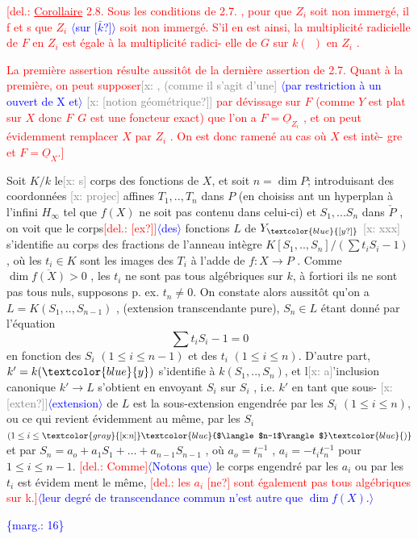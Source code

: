 \documentclass[11pt]{article}
\newcommand{\hand}[1]{\textcolor{blue}{#1}}
\newcommand{\inserted}[2][]{\textcolor{blue}{$\langle$#2$\rangle$}}
\newcommand{\margin}[1]{\textcolor{blue}{\{\textsf{marg.:} #1\}}}
\newcommand{\deleted}[1]{\textcolor{red}{[\textsf{del.:} #1]}}
\newcommand{\xout}[1]{\textcolor{gray}{[\textsf{x:} #1]}}
\newcommand{\uline}[1]{\underline{#1}}
\newcommand{\unsure}[1]{[#1?]}
\begin{document}
\deleted{\uline{Corollaire} 2.8. Sous les conditions de 2.7. , pour que $Z_i$ soit non
immergé, il f et s que $Z_i$ \inserted[typed]{sur \unsure{$\bar{k}$}} soit non immergé. S'il en est ainsi, la
multiplicité radicielle de $F$ en $Z_i$ est égale à la multiplicité radici-%
elle de $G$ sur $k(\ \ )$ en $Z_i$ .

La première assertion résulte aussitôt de la dernière assertion
de 2.7. Quant à la première, on peut supposer\xout{, (comme il s'agit d'une}
\inserted[typed]{par restriction à un ouvert de X et}
\xout{\unsure{notion géométrique}} par dévissage sur $F$ (comme $Y$ est plat sur $X$
donc $F\ \ G$ est une foncteur exact) que l'on a $F=\underline{O}_{Z_i}$ , et on peut
évidemment remplacer $X$ par $Z_i$ . On est donc ramené au cas où $X$ est intè-%
gre et $F=\underline{O}_X$.} Soit $K/k$ le\xout{s} corps des fonctions de $X$, et soit $n=\dim P$;
introduisant des coordonnées \xout{projec} affines $T_1,..,T_n$ dans $P$ (en choisiss
ant un hyperplan à l'infini $H_\infty$ tel que $f(X)$ ne soit pas contenu dans
celui-ci) et $S_1,...S_n$ dans $\check{P}$ , on voit que le corps\deleted{\unsure{ex}}\inserted{des} fonctions $L$
de $Y_{\hand{\unsure{y}}}$ \xout{xxx} s'identifie au corps des fractions de l'anneau intègre
$K[S_1,..,S_n]/(\sum t_iS_i - 1)$ , où les $t_i \in K$ sont les images des $T_i$ à
l'adde de $f:X\to P$ . Comme $\dim \overline{f(X)} > 0$ , les $t_i$ ne sont pas tous
algébriques sur $k$, à fortiori ils ne sont pas tous nuls, supposons
p. ex. $t_n \neq 0$. On constate alors aussitôt qu'on a $L = K(S_1,..,S_{n-1})$ ,
(extension transcendante pure), $S_n\in L$ étant donné par l'équation
\[ \sum t_iS_i - 1 = 0 \]
en fonction des $S_i$ $(1\leq i\leq n-1)$ et des $t_i$ $(1\leq i\leq n)$. D'autre part,
$k' = k(\hand{y})$ s'identifie à $k(S_1,..,S_n)$, et l\xout{a}'inclusion canonique
$k'\longrightarrow L$ s'obtient en envoyant $S_i$ sur $S_i$ , i.e. $k'$ en tant que sous-%
\xout{\unsure{exten}}\inserted[typed]{extension} de $L$ est la sous-extension engendrée par les $S_i$ $(1\leq i\leq n)$, ou
ce qui revient évidemment au même, par les $S_i$ $(1\leq i\leq \xout{n}\inserted[typed]{n-1}\hand{)}$ et par
$S_n = a_o + a_1S_1 + \ldots + a_{n-1}S_{n-1}$ , où $a_o = t_n^{-1}$ , $a_i =-t_it_n^{-1}$ pour
$1\leq i\leq n-1$. \deleted{Comme}\inserted{Notons que} le corps engendré par les $a_i$ ou par les $t_i$ est évidem
ment le même, \deleted{les $a_i$ \unsure{ne} sont également pas tous algébriques sur k.}\inserted{leur degré de transcendance commun
n'est autre que $\dim f(X)$.}

\margin{16}
\end{document}
